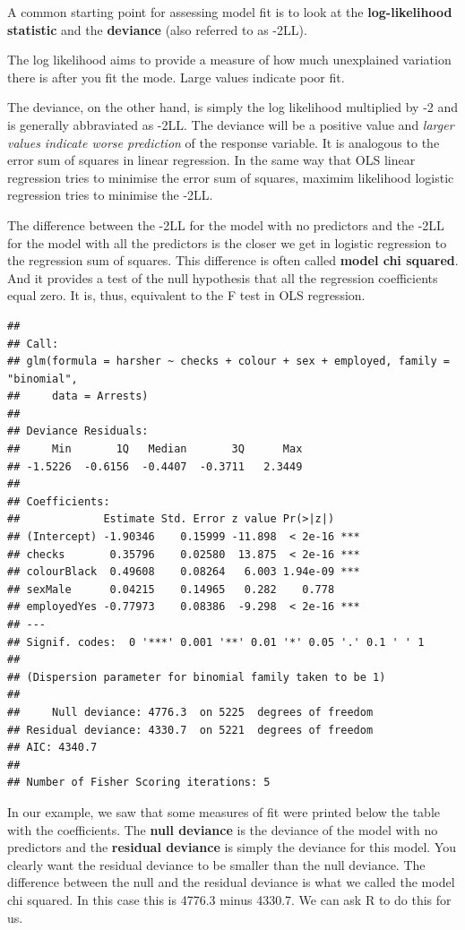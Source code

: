 \documentclass[]{book}
\theoremstyle{definition}
\theoremstyle{definition}
\theoremstyle{definition}
\theoremstyle{remark}
\begin{document}
A common starting point for assessing model fit is to look at the
\textbf{log-likelihood statistic} and the \textbf{deviance} (also
referred to as -2LL).

The log likelihood aims to provide a measure of how much unexplained
variation there is after you fit the mode. Large values indicate poor
fit.

The deviance, on the other hand, is simply the log likelihood multiplied
by -2 and is generally abbraviated as -2LL. The deviance will be a
positive value and \emph{larger values indicate worse prediction} of the
response variable. It is analogous to the error sum of squares in linear
regression. In the same way that OLS linear regression tries to minimise
the error sum of squares, maximim likelihood logistic regression tries
to minimise the -2LL.

The difference between the -2LL for the model with no predictors and the
-2LL for the model with all the predictors is the closer we get in
logistic regression to the regression sum of squares. This difference is
often called \textbf{model chi squared}. And it provides a test of the
null hypothesis that all the regression coefficients equal zero. It is,
thus, equivalent to the F test in OLS regression.

\begin{verbatim}
## 
## Call:
## glm(formula = harsher ~ checks + colour + sex + employed, family = "binomial", 
##     data = Arrests)
## 
## Deviance Residuals: 
##     Min       1Q   Median       3Q      Max  
## -1.5226  -0.6156  -0.4407  -0.3711   2.3449  
## 
## Coefficients:
##             Estimate Std. Error z value Pr(>|z|)    
## (Intercept) -1.90346    0.15999 -11.898  < 2e-16 ***
## checks       0.35796    0.02580  13.875  < 2e-16 ***
## colourBlack  0.49608    0.08264   6.003 1.94e-09 ***
## sexMale      0.04215    0.14965   0.282    0.778    
## employedYes -0.77973    0.08386  -9.298  < 2e-16 ***
## ---
## Signif. codes:  0 '***' 0.001 '**' 0.01 '*' 0.05 '.' 0.1 ' ' 1
## 
## (Dispersion parameter for binomial family taken to be 1)
## 
##     Null deviance: 4776.3  on 5225  degrees of freedom
## Residual deviance: 4330.7  on 5221  degrees of freedom
## AIC: 4340.7
## 
## Number of Fisher Scoring iterations: 5
\end{verbatim}

In our example, we saw that some measures of fit were printed below the
table with the coefficients. The \textbf{null deviance} is the deviance
of the model with no predictors and the \textbf{residual deviance} is
simply the deviance for this model. You clearly want the residual
deviance to be smaller than the null deviance. The difference between
the null and the residual deviance is what we called the model chi
squared. In this case this is 4776.3 minus 4330.7. We can ask R to do
this for us.
\end{document}
